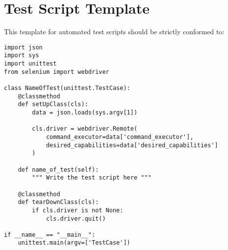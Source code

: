 \section{Test Script Template}
\thispagestyle{plain}

This template for automated test scripts should be strictly conformed to:
    
\begin{lstlisting}[caption=Template for Automated Test Scripts, label={listing.test_template}]
import json
import sys
import unittest
from selenium import webdriver

class NameOfTest(unittest.TestCase):
    @classmethod
    def setUpClass(cls):
        data = json.loads(sys.argv[1])

        cls.driver = webdriver.Remote(
            command_executor=data['command_executor'],
            desired_capabilities=data['desired_capabilities']
        )

    def name_of_test(self):
        """ Write the test script here """

    @classmethod
    def tearDownClass(cls):
        if cls.driver is not None:
            cls.driver.quit()

if __name__ == "__main__":
    unittest.main(argv=['TestCase'])
\end{lstlisting}